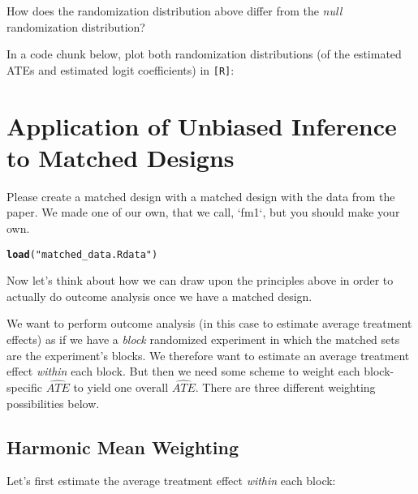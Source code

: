 \documentclass[11pt,leqno]{article}\usepackage[]{graphicx}\usepackage[]{color}
\makeatletter
\newcommand{\hlstr}[1]{\textcolor[rgb]{0.192,0.494,0.8}{#1}}%
\newcommand{\hlstd}[1]{\textcolor[rgb]{0.345,0.345,0.345}{#1}}%
\newcommand{\hlkwd}[1]{\textcolor[rgb]{0.737,0.353,0.396}{\textbf{#1}}}%
\newenvironment{kframe}{%
 \def\at@end@of@kframe{}%
 \ifinner\ifhmode%
  \def\at@end@of@kframe{\end{minipage}}%
  \begin{minipage}{\columnwidth}%
 \fi\fi%
 \def\FrameCommand##1{\hskip\@totalleftmargin \hskip-\fboxsep
 \colorbox{shadecolor}{##1}\hskip-\fboxsep
     \hskip-\linewidth \hskip-\@totalleftmargin \hskip\columnwidth}%
 \MakeFramed {\advance\hsize-\width
   \@totalleftmargin\z@ \linewidth\hsize
   \@setminipage}}%
 {\par\unskip\endMakeFramed%
 \at@end@of@kframe}
\newenvironment{knitrout}{}{} %
\theoremstyle{newstyle}
\makeatother
\begin{document}
How does the randomization distribution above differ from the \textit{null} randomization distribution?

In a code chunk below, plot both randomization distributions (of the estimated ATEs and estimated logit coefficients) in \texttt{[R]}:



\section{Application of Unbiased Inference to Matched Designs}

Please create a matched design with a matched design with the data from the
\citet{cerdaetal2012} paper. We made one of our own, that we call, `fm1`, but
you should make your own.

\begin{knitrout}\footnotesize
{}\color{fgcolor}\begin{kframe}
\begin{alltt}
\hlkwd{load}\hlstd{(}\hlstr{"matched_data.Rdata"}\hlstd{)}
\end{alltt}
\end{kframe}
\end{knitrout}

Now let's think about how we can draw upon the principles above in order to actually do outcome analysis once we have a matched design.

We want to perform outcome analysis (in this case to estimate average treatment effects) as if we have a \textit{block} randomized experiment in which the matched sets are the experiment's blocks. We therefore want to estimate an average treatment effect \textit{within} each block. But then we need some scheme to weight each block-specific $\widehat{ATE}$ to yield one overall $\widehat{ATE}$. There are three different weighting possibilities below.

\subsection{Harmonic Mean Weighting}

Let's first estimate the average treatment effect \textit{within} each block:
\end{document}
